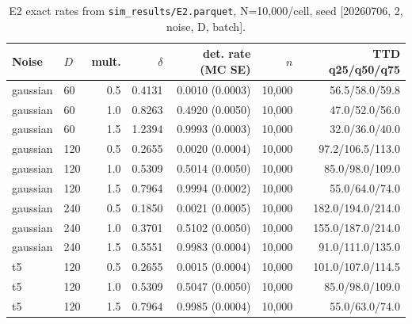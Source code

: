 \begin{table}[htbp]
\centering\small
\caption{E2 exact rates from \texttt{sim\_results/E2.parquet}, N=10,000/cell, seed [20260706, 2, noise, D, batch].}
\label{tab:rev3-e2-exact-rates}
\begin{tabular}{llrrrrr}
\toprule
Noise & $D$ & mult. & $\delta$ & det. rate (MC SE) & $n$ & TTD q25/q50/q75 \\
\midrule
gaussian & 60 & 0.5 & 0.4131 & 0.0010 (0.0003) & 10,000 & 56.5/58.0/59.8 \\
gaussian & 60 & 1.0 & 0.8263 & 0.4920 (0.0050) & 10,000 & 47.0/52.0/56.0 \\
gaussian & 60 & 1.5 & 1.2394 & 0.9993 (0.0003) & 10,000 & 32.0/36.0/40.0 \\
gaussian & 120 & 0.5 & 0.2655 & 0.0020 (0.0004) & 10,000 & 97.2/106.5/113.0 \\
gaussian & 120 & 1.0 & 0.5309 & 0.5014 (0.0050) & 10,000 & 85.0/98.0/109.0 \\
gaussian & 120 & 1.5 & 0.7964 & 0.9994 (0.0002) & 10,000 & 55.0/64.0/74.0 \\
gaussian & 240 & 0.5 & 0.1850 & 0.0021 (0.0005) & 10,000 & 182.0/194.0/214.0 \\
gaussian & 240 & 1.0 & 0.3701 & 0.5102 (0.0050) & 10,000 & 155.0/187.0/214.0 \\
gaussian & 240 & 1.5 & 0.5551 & 0.9983 (0.0004) & 10,000 & 91.0/111.0/135.0 \\
t5 & 120 & 0.5 & 0.2655 & 0.0015 (0.0004) & 10,000 & 101.0/107.0/114.5 \\
t5 & 120 & 1.0 & 0.5309 & 0.5047 (0.0050) & 10,000 & 85.0/98.0/109.0 \\
t5 & 120 & 1.5 & 0.7964 & 0.9985 (0.0004) & 10,000 & 55.0/63.0/74.0 \\
\bottomrule
\end{tabular}
\end{table}
